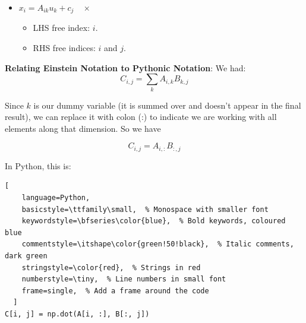 \begin{enumerate}[label=\textbf{Rule \arabic*}:, leftmargin=*, labelsep=1em]
\begin{itemize}
              \item $x_i = A_{ik}u_k + c_j \quad \times$
                    \begin{itemize}
                        \item LHS free index: $i$.
                        \item RHS free indices: $i$ and $j$.
                    \end{itemize}
          \end{itemize}
\end{enumerate}


\textbf{Relating Einstein Notation to Pythonic Notation}:
We had:
\begin{equation}
    C_{i,j} = \sum_k A_{i,k}B_{k,j}
\end{equation}

Since $k$ is our dummy variable (it is summed over and doesn't appear in the final result), we can replace it with colon (:) to indicate we are working with all elements along that dimension. So we have

\begin{equation}
    C_{i,j} = A_{i,:}B_{:,j}
\end{equation}

In Python, this is:
\begin{lstlisting}[
    language=Python,
    basicstyle=\ttfamily\small,  % Monospace with smaller font
    keywordstyle=\bfseries\color{blue},  % Bold keywords, coloured blue
    commentstyle=\itshape\color{green!50!black},  % Italic comments, dark green
    stringstyle=\color{red},  % Strings in red
    numberstyle=\tiny,  % Line numbers in small font
    frame=single,  % Add a frame around the code
  ]
C[i, j] = np.dot(A[i, :], B[:, j])
\end{lstlisting}





